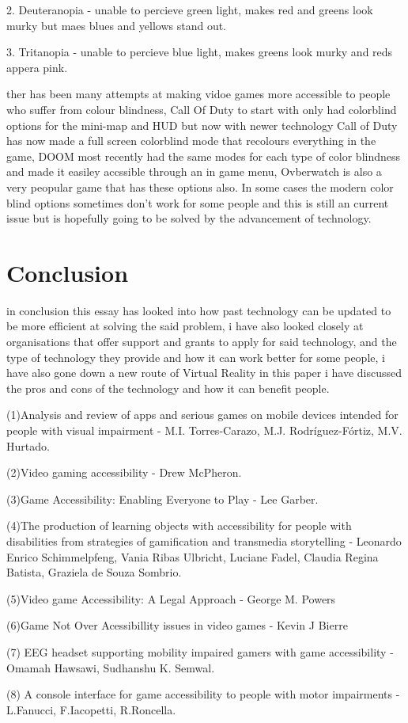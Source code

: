 \documentclass{scrartcl}
\begin{document}
2. Deuteranopia - unable to percieve green light, makes red and greens look murky but maes blues and yellows stand out.

3. Tritanopia - unable to percieve blue light, makes greens look murky and reds appera pink.

ther has been many attempts at making vidoe games more accessible to people who suffer from colour blindness, Call Of Duty to start with only had colorblind options for the mini-map and HUD but now with newer technology Call of Duty has now made a full screen colorblind mode that recolours everything in the game, DOOM most recently had the same modes for each type of color blindness and made it easiley accssible through an in game menu, Ovberwatch is also a very peopular game that has these options also.
 In some cases the modern color blind options sometimes don't work for some people and this is still an current issue but is hopefully going to be solved by the advancement of technology.


\section{Conclusion}
in conclusion this essay has looked into how past technology can be updated to be more efficient at solving the said problem, i have also looked closely at organisations that offer support and grants to apply for said technology, and the type of technology they provide and how it can work better for some people, i have also gone down a new route of Virtual Reality in this paper i have discussed the pros and cons of the technology and how it can benefit people.




(1)Analysis and review of apps and serious games on mobile devices intended for people with visual impairment - M.I. Torres-Carazo, M.J. Rodríguez-Fórtiz, M.V. Hurtado.

(2)Video gaming accessibility - Drew McPheron.

(3)Game Accessibility: Enabling Everyone to Play - Lee Garber.

(4)The production of learning objects with accessibility for people with disabilities from strategies of gamification and transmedia storytelling - Leonardo Enrico Schimmelpfeng, Vania Ribas Ulbricht, Luciane Fadel, Claudia Regina Batista, Graziela de Souza Sombrio.

(5)Video game Accessibility: A Legal Approach - George M. Powers

(6)Game Not Over Acessibillity issues in video games - Kevin J Bierre

(7) EEG headset supporting mobility impaired gamers with game accessibility - Omamah Hawsawi, Sudhanshu K. Semwal.

(8) A console interface for game accessibility to people with motor impairments - L.Fanucci,  F.Iacopetti,  R.Roncella.
\end{document}
